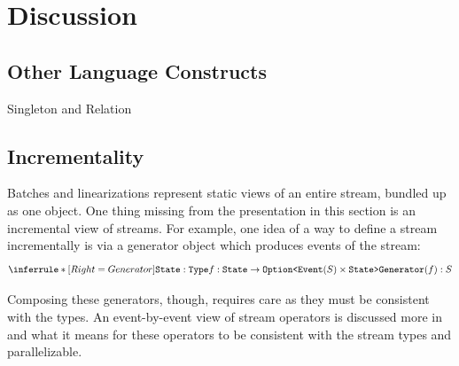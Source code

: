 \section{Discussion}

\subsection{Other Language Constructs}

Singleton and Relation



\subsection{Incrementality}

Batches and linearizations represent static views of an entire stream, bundled up as one object.
One thing missing from the presentation in this section is an incremental view of streams.
For example, one idea of a way to define a stream incrementally is via a generator object which produces events of the stream:
\[
\inference[Generator]
{
  \texttt{State}: \texttt{Type} \\
  f: \texttt{State} \to \texttt{Option<}\texttt{Event}(S) \times \texttt{State>}
}
{
  \texttt{Generator}(f): S
}
\]

Composing these generators, though, requires care as they must be consistent with the types. An event-by-event view of stream operators is discussed more in  and what it means for these operators to be consistent with the stream types and parallelizable.

